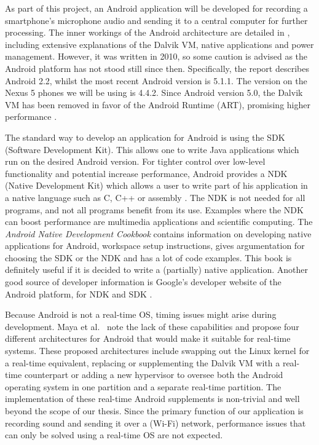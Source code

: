 As part of this project, an Android application will be developed for recording a smartphone's microphone audio and sending it to a central computer for further processing. The inner workings of the Android architecture are detailed in \cite{Brahler2010}, including extensive explanations of the Dalvik VM, native applications and power management. However, it was written in 2010, so some caution is advised as the Android platform has not stood still since then. Specifically, the report describes Android 2.2, whilst the most recent Android version is 5.1.1. The version on the Nexus 5 phones we will be using is 4.4.2. Since Android version 5.0, the Dalvik VM has been removed in favor of the Android Runtime (ART), promising higher performance \cite{android-art}.

The standard way to develop an application for Android is using the SDK (Software Development Kit). This allows one to write Java applications which run on the desired Android version. For tighter control over low-level functionality and potential increase performance, Android provides a NDK (Native Development Kit) which allows a user to write part of his application in a native language such as C, C++ or assembly \cite{liu2013}. The NDK is not needed for all programs, and not all programs benefit from its use. Examples where the NDK can boost performance are multimedia applications and scientific computing. The \textit{Android Native Development Cookbook} \cite{liu2013} contains information on developing native applications for Android, workspace setup instructions, gives argumentation for choosing the SDK or the NDK and has a lot of code examples. This book is definitely useful if it is decided to write a (partially) native application. Another good source of developer information is Google's developer website of the Android platform, for NDK \cite{android-ndk} and SDK \cite{android-getting-started}.

Because Android is not a real-time OS, timing issues might arise during development. Maya et al.\ \cite{Maya2010} note the lack of these capabilities and propose four different architectures for Android that would make it suitable for real-time systems. These proposed architectures include swapping out the Linux kernel for a real-time equivalent, replacing or supplementing the Dalvik VM with a real-time counterpart or adding a new hypervisor to oversee both the Android operating system in one partition and a separate real-time partition. The implementation of these real-time Android supplements is non-trivial and well beyond the scope of our thesis. Since the primary function of our application is recording sound and sending it over a (Wi-Fi) network, performance issues that can only be solved using a real-time OS are not expected.

